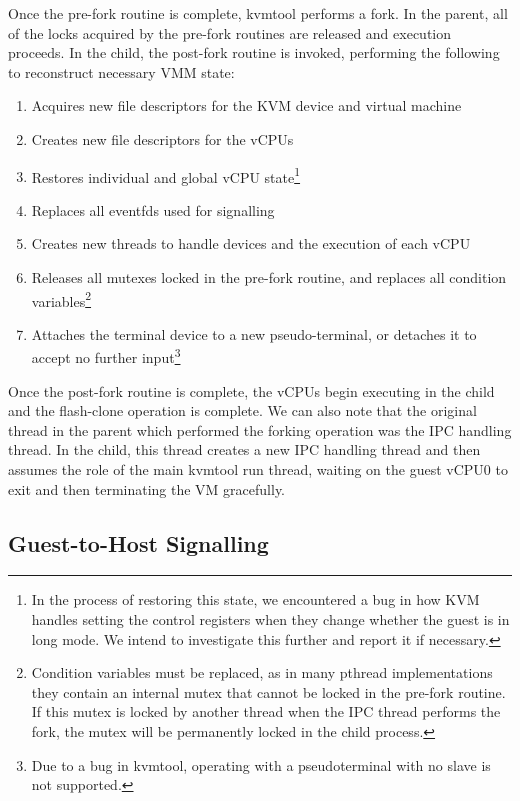 Once the pre-fork routine is complete, kvmtool performs a fork. In the
parent, all of the locks acquired by the pre-fork routines are released and
execution proceeds. In the child, the post-fork routine is invoked, performing
the following to reconstruct necessary VMM state:

\begin{enumerate}
\item Acquires new file descriptors for the KVM device and virtual machine
\item Creates new file descriptors for the vCPUs
\item Restores individual and global vCPU state\footnote{In the process of
restoring this state, we encountered a bug in how KVM handles setting the
control registers when they change whether the guest is in long mode. We intend
to investigate this further and report it if necessary.}
\item Replaces all eventfds used for signalling
\item Creates new threads to handle devices and the execution of each vCPU
\item Releases all mutexes locked in the pre-fork routine, and replaces all
condition variables\footnote{Condition variables must be replaced, as in many
pthread implementations they contain an internal mutex that cannot be locked in
the pre-fork routine. If this mutex is locked by another thread when the IPC
thread performs the fork, the mutex will be permanently locked in the child
process.}
\item Attaches the terminal device to a new pseudo-terminal, or detaches it to
accept no further input\footnote{Due to a bug in kvmtool, operating with a
pseudoterminal with no slave is not supported.}
\end{enumerate}

Once the post-fork routine is complete, the vCPUs begin executing in the child
and the flash-clone operation is complete. We can also note that the original
thread in the parent which performed the forking operation was the IPC handling
thread. In the child, this thread creates a new IPC handling thread and then
assumes the role of the main kvmtool run thread, waiting on the guest vCPU0 to
exit and then terminating the VM gracefully.

\subsection{Guest-to-Host Signalling}

